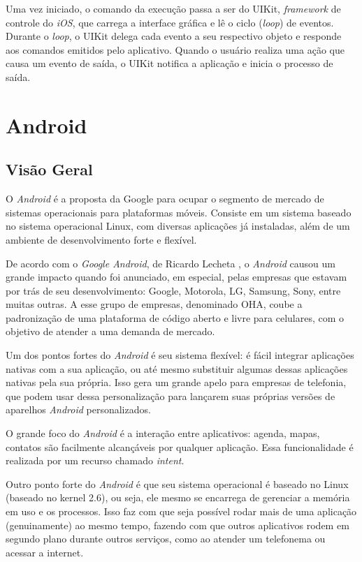  Uma vez iniciado, o comando da execução passa a ser do UIKit, \emph{framework} de controle do \emph{iOS}, que carrega a interface gráfica e lê o ciclo (\emph{loop}) de eventos. Durante o \emph{loop}, o UIKit delega cada evento a seu respectivo objeto e responde aos comandos emitidos pelo aplicativo. Quando o usuário realiza uma ação que causa um evento de saída, o UIKit notifica a aplicação e inicia o processo de saída.


 \section{Android}

 \subsection{Visão Geral}
 	O \emph{Android} é a proposta da Google para ocupar o segmento de mercado de sistemas operacionais para plataformas móveis. Consiste em um sistema baseado no sistema operacional Linux, com diversas aplicações já instaladas, além de um ambiente de desenvolvimento forte e flexível. 
	
 	De acordo com o \emph{Google Android}, de Ricardo Lecheta \cite{lecheta}, o \emph{Android} causou um grande impacto quando foi anunciado, em especial, pelas empresas que estavam por trás de seu desenvolvimento: Google, Motorola, LG, Samsung, Sony, entre muitas outras. A esse grupo de empresas, denominado \ac{OHA}, coube a padronização de uma plataforma de código aberto e livre para celulares, com o objetivo de atender a uma demanda de mercado.
	
 	Um dos pontos fortes do \emph{Android} é seu sistema flexível: é fácil integrar aplicações nativas com a sua aplicação, ou até mesmo substituir algumas dessas aplicações nativas pela sua própria. Isso gera um grande apelo para empresas de telefonia, que podem usar dessa personalização para lançarem suas próprias versões de aparelhos \emph{Android} personalizados.
	
 	O grande foco do \emph{Android} é a interação entre aplicativos: agenda, mapas, contatos são facilmente alcançáveis por qualquer aplicação. Essa funcionalidade é realizada por um recurso chamado \emph{intent}.%
	
 	Outro ponto forte do \emph{Android} é que seu sistema operacional é baseado no Linux (baseado no kernel 2.6), ou seja, ele mesmo se encarrega de gerenciar a memória em uso e os processos. Isso faz com que seja possível rodar mais de uma aplicação (genuinamente) ao mesmo tempo, fazendo com que outros aplicativos rodem em segundo plano durante outros serviços, como ao atender um telefonema ou acessar a internet.  
	
